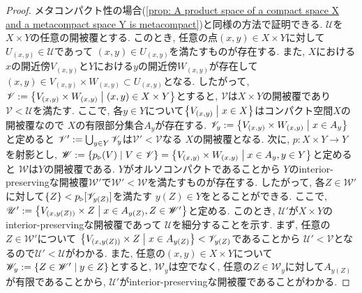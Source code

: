\documentclass[uplatex, dvipdfmx, a4paper, 12pt, class=jsbook, crop=false]{standalone}
\begin{document}
\begin{proof}
	メタコンパクト性の場合(\cref{prop: A product space of a compact space X and a metacompact space Y is metacompact})と同様の方法で証明できる. 
	$ \mathscr{U} $を$ X \times Y $の任意の開被覆とする. 
	このとき, 任意の点$ (x, y) \in X \times Y $に対して$ U_{(x, y)} \in \mathscr{U} $であって
	$ (x, y) \in U_{(x, y)} $を満たすものが存在する. 
	また, $ X $における$ x $の開近傍$ V_{(x, y)} $と$ Y $における$ y $の開近傍$ W_{(x, y)} $が存在して
	$ (x, y) \in V_{(x,y)} \times W_{(x, y)} \subset U_{(x, y)} $となる. 
	したがって, $ \mathscr{V} \defeq \setcomp{V_{(x, y)} \times W_{(x, y)}}{(x, y) \in X \times Y} $とすると, 
	$ \mathscr{V} $は$ X \times Y $の開被覆であり$ \mathscr{V} < \mathscr{U} $を満たす. 
	ここで, 各$ y \in Y $について$ \setcomp{V_{(x, y)}}{x \in X} $はコンパクト空間$ X $の開被覆なので
	$ X $の有限部分集合$ A_y $が存在する. 
	$ \mathscr{V}_y \defeq \setcomp{V_{(x, y)} \times W_{(x, y)}}{x \in A_y} $と定めると
	$ \mathscr{V}' \mathrel{:=} \bigcup_{y \in Y}\mathscr{V}_y $は$ \mathscr{V}' < \mathscr{V} $なる
	$ X $の開被覆となる. 次に, $ p \colon X \times Y \to Y $を射影とし, 
	$ \mathscr{W} \defeq \setcomp{p_{\imgto}(V)}{V \in \mathscr{V}} = \setcomp{V_{(x, y)} \times W_{(x, y)}}{x \in A_y, y \in Y} $と定めると
	$ \mathscr{W} $は$ Y $の開被覆である. $ Y $がオルソコンパクトであることから
	$ Y $のinterior-preservingな開被覆$ \mathscr{W}' $で$ \mathscr{W}' < \mathscr{W} $を満たすものが存在する. 
	したがって, 各$ Z \in \mathscr{W}' $に対して$ \{Z\} <  p_{{}\triangleright{}}[\mathscr{V}_{y(Z)}] $を満たす
	$ y(Z) \in Y $をとることができる. 
	ここで, $ \mathscr{U}' \defeq  \setcomp{V_{(x, y(Z))} \times Z}{x \in A_{y(Z)}, Z \in \mathscr{W}'} $と定める. 
	このとき, $ \mathscr{U}' $が$ X \times Y $のinterior-preservingな開被覆であって
	$ \mathscr{U} $を細分することを示す. まず, 任意の$ Z \in \mathscr{W}' $について
	$ \setcomp{V_{(x, y(Z))} \times Z}{x \in A_{y(Z)}} < \mathscr{V}_{y(Z)} $であることから
	$ \mathscr{U}' < \mathscr{V} $となるので$ \mathscr{U}' < \mathscr{U} $がわかる. 
	また, 任意の$ (x, y) \in X \times Y $について
	$ \mathscr{W}_y \defeq \setcomp{Z \in \mathscr{W}'}{y \in Z} $とすると, $ \mathscr{W}_y $は空でなく, 
	任意の$ Z \in \mathscr{W}_y $に対して$ A_{y(Z)} $が有限であることから, 
	$ \mathscr{U}' $がinterior-preservingな開被覆であることがわかる.
\end{proof}
\end{document}
